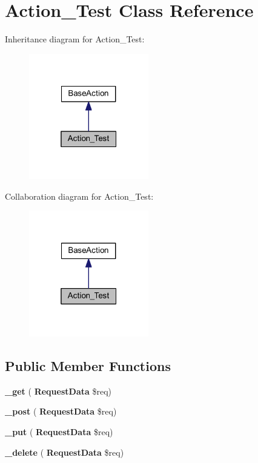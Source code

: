 \section{Action\+\_\+\+Test Class Reference}
\label{class_lora_1_1_api_1_1_action___test}


Inheritance diagram for Action\+\_\+\+Test\+:\nopagebreak
\begin{figure}[H]
\begin{center}
\leavevmode
\includegraphics[width=148pt]{class_lora_1_1_api_1_1_action___test__inherit__graph}
\end{center}
\end{figure}


Collaboration diagram for Action\+\_\+\+Test\+:\nopagebreak
\begin{figure}[H]
\begin{center}
\leavevmode
\includegraphics[width=148pt]{class_lora_1_1_api_1_1_action___test__coll__graph}
\end{center}
\end{figure}
\subsection*{Public Member Functions}
\begin{DoxyCompactItemize}
\item 
\mbox{\label{class_lora_1_1_api_1_1_action___test_a3ad4bf1b146a3180b34d1327ff2abf69}} 
{\bfseries \+\_\+get} (\textbf{ Request\+Data} \$req)
\item 
\mbox{\label{class_lora_1_1_api_1_1_action___test_a50751d47a139282d1c3b08cab1b6562e}} 
{\bfseries \+\_\+post} (\textbf{ Request\+Data} \$req)
\item 
\mbox{\label{class_lora_1_1_api_1_1_action___test_a2affcc8f31c13147c33450193b229194}} 
{\bfseries \+\_\+put} (\textbf{ Request\+Data} \$req)
\item 
\mbox{\label{class_lora_1_1_api_1_1_action___test_ab8ddc6de1e04524212f7d55893f78864}} 
{\bfseries \+\_\+delete} (\textbf{ Request\+Data} \$req)
\end{DoxyCompactItemize}

